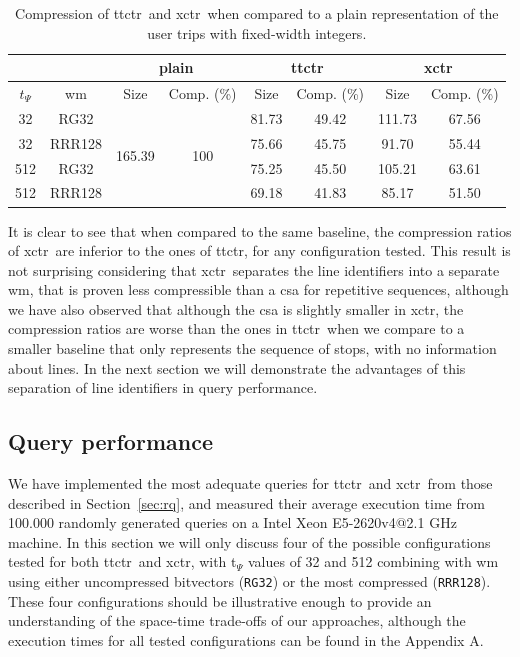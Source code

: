     \begin{table}
        \centering
        \caption{Compression of \acrshort{ttctr}~and \acrshort{xctr}~when compared to a plain representation of the user trips with fixed-width integers.}
        \label{tab:comp}
        \begin{tabular}{|c|c|c|c|c|c|c|c|}
        \cline{3-8}
        \multicolumn{2}{c}{} & \multicolumn{2}{|c|}{plain} & \multicolumn{2}{|c|}{\gls{ttctr}} & \multicolumn{2}{|c|}{\gls{xctr}} \\
        \hline
        $t_{\Psi}$ & \gls{wm} & Size & Comp. (\%) & Size & Comp. (\%) & Size & Comp. (\%) \\
        \hline
        32 & RG32 & \multirow{4}{*}{165.39} & \multirow{4}{*}{100} & 81.73 & 49.42 & 111.73 & 67.56 \\
        32 & RRR128 & & & 75.66 & 45.75 & 91.70 & 55.44 \\
        512 & RG32 & & & 75.25 & 45.50 & 105.21 & 63.61 \\
        512 & RRR128 & & & 69.18 & 41.83 & 85.17 & 51.50 \\
        \hline
        \end{tabular}
    \end{table}
    
    It is clear to see that when compared to the same baseline, the compression ratios of \gls{xctr}~are inferior to the ones of \gls{ttctr}, for any configuration tested. This result is not surprising considering that \gls{xctr}~separates the line identifiers into a separate \gls{wm}, that is proven less compressible than a \gls{csa} for repetitive sequences, although we have also observed that although the \gls{csa} is slightly smaller in \gls{xctr}, the compression ratios are worse than the ones in \gls{ttctr}~when we compare to a smaller baseline that only represents the sequence of stops, with no information about lines. In the next section we will demonstrate the advantages of this separation of line identifiers in query performance.
    
    \subsection{Query performance}
    \label{sec:time}
    We have implemented the most adequate queries for \gls{ttctr}~and \gls{xctr}~from those described in Section~\ref{sec:rq}, and measured their average execution time from 100.000 randomly generated queries on a Intel Xeon E5-2620v4@2.1 GHz machine. In this section we will only discuss four of the possible configurations tested for both \gls{ttctr}~and \gls{xctr}, with t$_{\Psi}$ values of 32 and 512 combining with \gls{wm} using either uncompressed bitvectors (\texttt{RG32}) or the most compressed (\texttt{RRR128}). These four configurations should be illustrative enough to provide an understanding of the space-time trade-offs of our approaches, although the execution times for all tested configurations can be found in the Appendix A.
    
